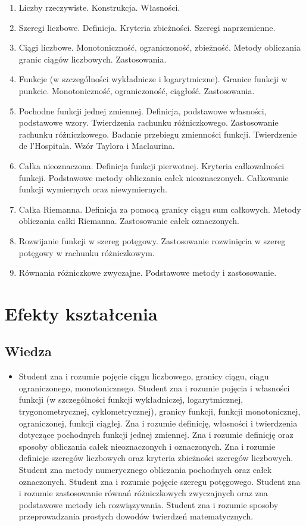 \documentclass[12pt, a4paper]{article}
\begin{document}
\begin{enumerate}
  \item Liczby rzeczywiste. Konstrukcja. Własności.
  \item Szeregi liczbowe. Definicja. Kryteria zbieżności. Szeregi naprzemienne.
  \item Ciągi liczbowe. Monotoniczność, ograniczoność, zbieżność. Metody obliczania granic ciągów liczbowych. Zastosowania.
  \item Funkcje (w szczególności wykładnicze i logarytmiczne).  Granice funkcji w punkcie. Monotoniczność, ograniczoność, ciągłość. Zastosowania.
  \item Pochodne funkcji jednej zmiennej. Definicja, podstawowe własności, podstawowe wzory.  Twierdzenia rachunku różniczkowego. Zastosowanie rachunku różniczkowego. Badanie przebiegu zmienności funkcji. Twierdzenie de l’Hospitala.  Wzór Taylora i Maclaurina.
  \item Całka nieoznaczona. Definicja funkcji pierwotnej. Kryteria całkowalności funkcji. Podstawowe metody obliczania całek nieoznaczonych. Całkowanie funkcji wymiernych oraz niewymiernych.
  \item Całka Riemanna. Definicja za pomocą granicy ciągu sum całkowych. Metody obliczania całki Riemanna. Zastosowanie całek oznaczonych.
  \item Rozwijanie funkcji w szereg potęgowy. Zastosowanie rozwinięcia w szereg potęgowy w rachunku różniczkowym.
  \item Równania różniczkowe zwyczajne. Podstawowe metody i zastosowanie.
\end{enumerate}

\section{Efekty kształcenia}

\subsection*{Wiedza}
\begin{itemize}
  \item Student zna i rozumie pojęcie ciągu liczbowego, granicy ciągu, ciągu ograniczonego, monotonicznego. Student zna i rozumie pojęcia i własności funkcji (w szczególności funkcji wykładniczej, logarytmicznej, trygonometrycznej, cyklometrycznej), granicy funkcji, funkcji monotonicznej, ograniczonej, funkcji ciągłej. Zna i rozumie definicję, własności i twierdzenia dotyczące pochodnych funkcji jednej zmiennej. Zna i rozumie definicję oraz sposoby obliczania całek nieoznaczonych i oznaczonych. Zna i rozumie definicje szeregów liczbowych oraz kryteria zbieżności szeregów liczbowych. Student zna metody numerycznego obliczania pochodnych oraz całek oznaczonych. Student zna i rozumie pojęcie szeregu potęgowego.  Student zna i rozumie zastosowanie równań różniczkowych zwyczajnych oraz zna podstawowe metody ich rozwiązywania. Student zna i rozumie sposoby przeprowadzania prostych dowodów twierdzeń matematycznych.
\end{itemize}
\end{document}
